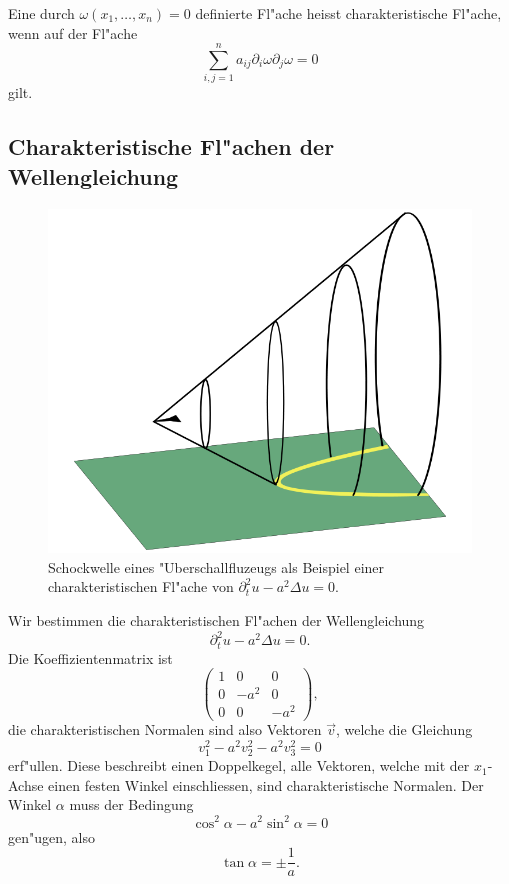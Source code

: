 \begin{definition}
Eine durch $\omega(x_1,\dots,x_n)=0$ definierte Fl"ache heisst
charakteristische Fl"ache, wenn auf der Fl"ache
\[
\sum_{i,j=1}^na_{ij}\partial_i\omega\partial_j\omega=0
\]
gilt.
\end{definition}

\subsection{Charakteristische Fl"achen der Wellengleichung}
\begin{figure}
\begin{center}
\includegraphics[width=0.8\hsize]{graphics/shock}
\end{center}
\caption{Schockwelle eines "Uberschallfluzeugs als Beispiel einer
charakteristischen Fl"ache von $\partial_t^2u-a^2\Delta u=0$.\label{ueberschallkegel}}
\end{figure}
Wir bestimmen die charakteristischen Fl"achen der
Wellengleichung
\[
\partial_t^2u-a^2\Delta u=0.
\]
Die Koeffizientenmatrix ist
\[
\begin{pmatrix}
1&0&0\\
0&-a^2&0\\
0&0&-a^2
\end{pmatrix},
\]
die charakteristischen Normalen sind also Vektoren $\vec v$, welche die
Gleichung
\[
v_1^2-a^2v_2^2-a^2v_3^2=0
\]
erf"ullen. Diese beschreibt einen Doppelkegel, alle Vektoren, welche mit
der $x_1$-Achse einen festen Winkel einschliessen, sind charakteristische
Normalen. Der Winkel $\alpha$ muss der Bedingung
\[
\cos^2\alpha-a^2\sin^2\alpha=0
\]
gen"ugen, also
\[
\tan\alpha=\pm\frac1a.
\]

